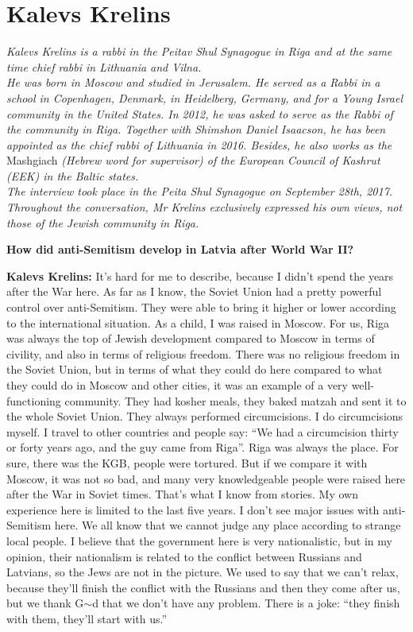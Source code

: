 \section{Kalevs Krelins}

\textit{Kalevs Krelins is a rabbi in the Peitav Shul Synagogue in Riga and at the same time chief rabbi in Lithuania and Vilna.\\
He was born in Moscow and studied in Jerusalem. He served as a Rabbi in a school in Copenhagen, Denmark, in Heidelberg, Germany, and for a Young Israel community in the United States. In 2012, he was asked to serve as the Rabbi of the community in Riga. Together with Shimshon Daniel Isaacson, he has been appointed as the chief rabbi of Lithuania in 2016. Besides, he also works as the} Mashgiach \textit{(Hebrew word for supervisor) of the European Council of Kashrut (EEK) in the Baltic states.\\
The interview took place in the Peita Shul Synagogue on September 28th, 2017. Throughout the conversation, Mr Krelins exclusively expressed his own views, not those of the Jewish community in Riga.} \par 
\vspace*{2em}
\textbf{How did anti-Semitism develop in Latvia after World War II?}  

\textbf{Kalevs Krelins:} It’s hard for me to describe, because I didn’t spend the years after the War here. As far as I know, the Soviet Union had a pretty powerful control over anti-Semitism. They were able to bring it higher or lower according to the international situation. As a child, I was raised in Moscow. For us, Riga was always the top of Jewish development compared to Moscow in terms of civility, and also in terms of religious freedom. There was no religious freedom in the Soviet Union, but in terms of what they could do here compared to what they could do in Moscow and other cities, it was an example of a very well-functioning community. They had kosher meals, they baked matzah and sent it to the whole Soviet Union. They always performed circumcisions. I do circumcisions myself. I travel to other countries and people say: ``We had a circumcision thirty or forty years ago, and the guy came from Riga''. Riga was always the place. For sure, there was the KGB, people were tortured. But if we compare it with Moscow, it was not so bad, and many very knowledgeable people were raised here after the War in Soviet times. That’s what I know from stories. My own experience here is limited to the last five years. I don’t see major issues with anti-Semitism here.  We all know that we cannot judge any place according to strange local people. I believe that the government here is very nationalistic, but in my opinion, their nationalism is related to the conflict between Russians and Latvians, so the Jews are not in the picture. We used to say that we can’t relax, because they’ll finish the conflict with the Russians and then they come after us, but we thank G$\sim$d that we don’t have any problem. There is a joke: ``they finish with them, they’ll start with us.''  

